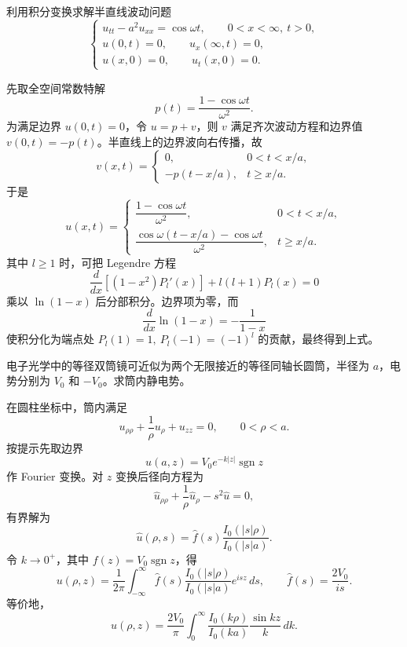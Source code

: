 \begin{question}
利用积分变换求解半直线波动问题
\[
\begin{cases}
u_{tt}-a^2u_{xx}=\cos\omega t,\qquad 0<x<\infty,\ t>0,\\
u(0,t)=0,\qquad u_x(\infty,t)=0,\\
u(x,0)=0,\qquad u_t(x,0)=0.
\end{cases}
\]
\begin{solution}
先取全空间常数特解
\[
p(t)=\frac{1-\cos\omega t}{\omega^2}.
\]
为满足边界 \(u(0,t)=0\)，令 \(u=p+v\)，则 \(v\) 满足齐次波动方程和边界值 \(v(0,t)=-p(t)\)。半直线上的边界波向右传播，故
\[
v(x,t)=
\begin{cases}
0,&0<t<x/a,\\
-p(t-x/a),&t\ge x/a.
\end{cases}
\]
于是
\[
u(x,t)=
\begin{cases}
\dfrac{1-\cos\omega t}{\omega^2},&0<t<x/a,\\[0.6em]
\dfrac{\cos\omega(t-x/a)-\cos\omega t}{\omega^2},&t\ge x/a.
\end{cases}
\]
其中 \(l\ge1\) 时，可把 Legendre 方程
\[
\frac d{dx}\left[(1-x^2)P_l'(x)\right]+l(l+1)P_l(x)=0
\]
乘以 \(\ln(1-x)\) 后分部积分。边界项为零，而
\[
\frac d{dx}\ln(1-x)=-\frac1{1-x}
\]
使积分化为端点处 \(P_l(1)=1,\ P_l(-1)=(-1)^l\) 的贡献，最终得到上式。
\end{solution}
\end{question}

\begin{question}
电子光学中的等径双筒镜可近似为两个无限接近的等径同轴长圆筒，半径为 \(a\)，电势分别为 \(V_0\) 和 \(-V_0\)。求筒内静电势。

\begin{solution}
在圆柱坐标中，筒内满足
\[
u_{\rho\rho}+\frac1\rho u_\rho+u_{zz}=0,\qquad 0<\rho<a.
\]
按提示先取边界
\[
u(a,z)=V_0e^{-k|z|}\operatorname{sgn}z
\]
作 Fourier 变换。对 \(z\) 变换后径向方程为
\[
\hat u_{\rho\rho}+\frac1\rho\hat u_\rho-s^2\hat u=0,
\]
有界解为
\[
\hat u(\rho,s)=\hat f(s)\frac{I_0(|s|\rho)}{I_0(|s|a)}.
\]
令 \(k\to0^+\)，其中 \(f(z)=V_0\operatorname{sgn}z\)，得
\[
u(\rho,z)=\frac1{2\pi}\int_{-\infty}^{\infty}
\hat f(s)\frac{I_0(|s|\rho)}{I_0(|s|a)}e^{isz}\,ds,
\qquad
\hat f(s)=\frac{2V_0}{is}.
\]
等价地，
\[
u(\rho,z)=\frac{2V_0}{\pi}\int_0^\infty
\frac{I_0(k\rho)}{I_0(ka)}\frac{\sin kz}{k}\,dk.
\]
\end{solution}
\end{question}

